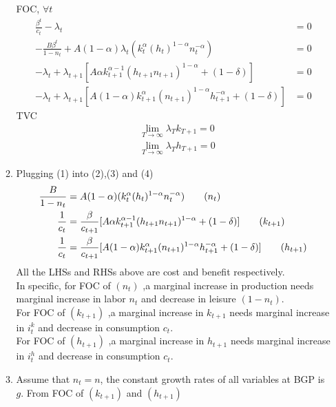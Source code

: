 \documentclass{article}
\begin{document}
\begin{enumerate}
\begin{enumerate}
\begin{equation*}
            \end{equation*}
            FOC, $\forall t$
            \begin{align}
                \frac{\beta^t}{c_t}-\lambda_t&=0\\
                -\frac{B\beta^t}{1-n_t}+A(1-\alpha)\lambda_t(k_t^\alpha(h_t)^{1-\alpha}n_t^{-\alpha})&=0\\
                -\lambda_t+\lambda_{t+1}[A\alpha k_{t+1}^{\alpha-1}(h_{t+1}n_{t+1})^{1-\alpha}+(1-\delta)]&=0\\
                -\lambda_t+\lambda_{t+1}[A(1-\alpha)k_{t+1}^{\alpha}(n_{t+1})^{1-\alpha}h_{t+1}^{-\alpha}+(1-\delta)]&=0
            \end{align}
            TVC
            \begin{align*}
                &\lim_{T\to\infty}\lambda_Tk_{T+1}=0\\
                &\lim_{T\to\infty}\lambda_Th_{T+1}=0
            \end{align*}
            \item Plugging (1) into (2),(3) and (4)
            \begin{align}
                \frac{B}{1-n_t}&=A(1-\alpha)(k_t^\alpha(h_t)^{1-\alpha}n_t^{-\alpha})\tag{$n_t$}\\
                \frac{1}{c_t}&=\frac{\beta}{c_{t+1}}[A\alpha k_{t+1}^{\alpha-1}(h_{t+1}n_{t+1})^{1-\alpha}+(1-\delta)]\tag{$k_{t+1}$}\\
                \frac{1}{c_t}&=\frac{\beta}{c_{t+1}}[A(1-\alpha)k_{t+1}^{\alpha}(n_{t+1})^{1-\alpha}h_{t+1}^{-\alpha}+(1-\delta)]\tag{$h_{t+1}$}
            \end{align}
            All the LHSs and RHSs above are cost and benefit respectively. \\
            In specific, for FOC of $(n_t)$ ,a marginal increase in production needs marginal increase in labor $n_t$ and decrease in leisure $(1-n_t)$.\\
            For FOC of $(k_{t+1})$ ,a marginal increase in $k_{t+1}$ needs marginal increase in $i_t^k$ and decrease in consumption $c_t$.\\
            For FOC of $(h_{t+1})$ ,a marginal increase in $h_{t+1}$ needs marginal increase in $i_t^h$ and decrease in consumption $c_t$.
            \item Assume that $n_t=n$, the constant growth rates of all variables at BGP is $g$.
            From FOC of $(k_{t+1})$ and $(h_{t+1})$
            \begin{align*}

\end{align*}
\end{enumerate}
\end{enumerate}
\end{document}

